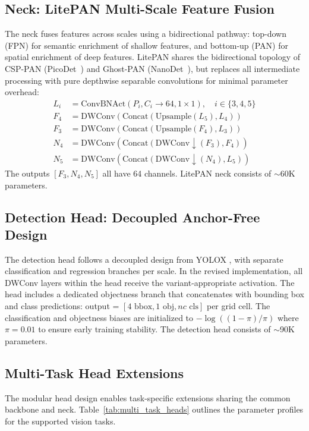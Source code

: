\documentclass[conference]{IEEEtran}
\begin{document}
\subsection{Neck: LitePAN Multi-Scale Feature Fusion}
The neck fuses features across scales using a bidirectional pathway: top-down (FPN) for semantic enrichment of shallow features, and bottom-up (PAN) for spatial enrichment of deep features. LitePAN shares the bidirectional topology of CSP-PAN (PicoDet~\cite{yu2021picodet}) and Ghost-PAN (NanoDet~\cite{lyu2020nanodet}), but replaces all intermediate processing with pure depthwise separable convolutions for minimal parameter overhead:
\begin{align}
  L_i &= \text{ConvBNAct}(P_i, C_i \to 64, 1\times1), \quad i \in \{3, 4, 5\} \\
  F_4 &= \text{DWConv}(\text{Concat}(\text{Upsample}(L_5), L_4)) \\
  F_3 &= \text{DWConv}(\text{Concat}(\text{Upsample}(F_4), L_3)) \\
  N_4 &= \text{DWConv}(\text{Concat}(\text{DWConv}\downarrow(F_3), F_4)) \\
  N_5 &= \text{DWConv}(\text{Concat}(\text{DWConv}\downarrow(N_4), L_5))
\end{align}
The outputs $[F_3, N_4, N_5]$ all have 64 channels. LitePAN neck consists of $\sim$60K parameters.

\subsection{Detection Head: Decoupled Anchor-Free Design}
The detection head follows a decoupled design from YOLOX \cite{ge2021yolox}, with separate classification and regression branches per scale. In the revised implementation, all DWConv layers within the head receive the variant-appropriate activation. The head includes a dedicated objectness branch that concatenates with bounding box and class predictions: output = $[4 \text{ bbox}, 1 \text{ obj}, nc \text{ cls}]$ per grid cell. The classification and objectness biases are initialized to $-\log((1-\pi)/\pi)$ where $\pi = 0.01$ to ensure early training stability. The detection head consists of $\sim$90K parameters.

\subsection{Multi-Task Head Extensions}
The modular head design enables task-specific extensions sharing the common backbone and neck. Table~\ref{tab:multi_task_heads} outlines the parameter profiles for the supported vision tasks.
\end{document}
